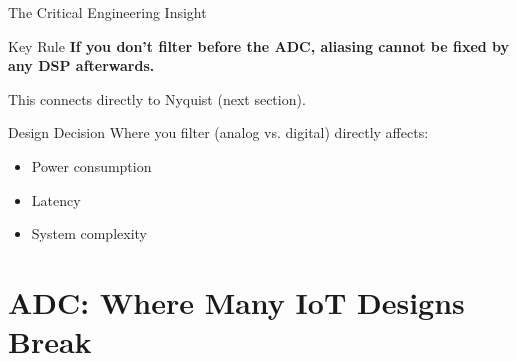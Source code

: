 \documentclass[aspectratio=169,11pt]{beamer}
\begin{document}
\begin{frame}{The Critical Engineering Insight}
    \begin{alertblock}{Key Rule}
        \textbf{If you don't filter before the ADC, aliasing cannot be fixed by any DSP afterwards.}
    \end{alertblock}
    
    \vspace{0.5cm}
    This connects directly to Nyquist (next section).
    
    \vspace{0.5cm}
    \begin{block}{Design Decision}
        Where you filter (analog vs. digital) directly affects:
        \begin{itemize}
            \item Power consumption
            \item Latency
            \item System complexity
        \end{itemize}
    \end{block}
\end{frame}

\section{ADC: Where Many IoT Designs Break}
\end{document}
